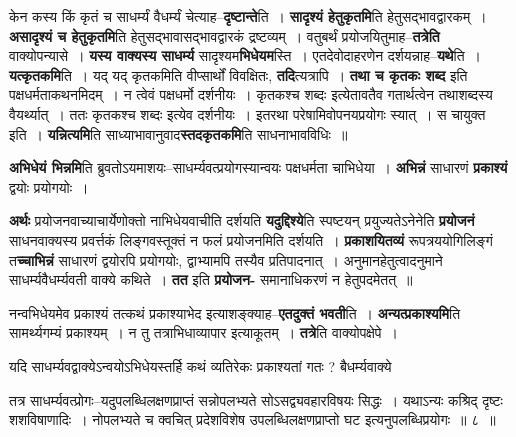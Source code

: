 \documentclass[article,12pt,a4paper]{memoir}
\begin{document}
	  \endgroup
	

	  \pstart केन कस्य किं कृतं च साधर्म्यं वैधर्म्यं चेत्याह--\textbf{दृष्टान्ते}ति । \textbf{सादृश्यं हेतुकृतमि}ति हेतुसद्भावद्वारकम् । \textbf{असादृश्यं च हेतुकृतमि}ति हेतुसद्भावासद्भावद्वारकं द्रष्टव्यम् । वतुबर्थं प्रयोजयितुमाह--\textbf{तत्रेति} वाक्योपन्यासे । \textbf{यस्य वाक्यस्य साधर्म्य} सादृश्यम\textbf{भिधेयम}स्ति । एतदेवोदाहरणेन दर्शयन्नाह--\textbf{यथे}ति । \textbf{यत्कृतकमि}ति । यद् यद् कृतकमिति वीप्सार्थों विवक्षितः, \textbf{तदि}त्यत्रापि । \textbf{तथा च कृतकः शब्द} इति पक्षधर्मताकथनमिदम् । न त्वेवं पक्षधर्मो दर्शनीयः । कृतकश्च शब्दः इत्येतावतैव गतार्थत्वेन तथाशब्दस्य वैयर्थ्यात् । ततः कृतकश्च शब्दः इत्येव दर्शनीयः । इतरथा परेषामिवोपनयप्रयोगः स्यात् । स चायुक्त इति । \textbf{यन्नित्यमि}ति साध्याभावानुवाद\textbf{स्तदकृतकमि}ति साधनाभावविधिः ॥
	\pend
      

	  \pstart \textbf{अभिधेयं भिन्नमि}ति ब्रुवतोऽयमाशयः--साधर्म्यवत्प्रयोगस्यान्वयः पक्षधर्मता चाभिधेया । \textbf{अभिन्नं} साधारणं \textbf{प्रकाश्यं} द्वयोः प्रयोगयोः ।
	\pend
      

	  \pstart \textbf{अर्थः} प्रयोजनवाच्याचार्येणोक्तो नाभिधेयवाचीति दर्शयति \textbf{यदुद्दिश्ये}ति स्पष्टयन् प्रयुज्यतेऽनेनेति \textbf{प्रयोजनं} साधनवाक्यस्य प्रवर्त्तकं लिङ्गवस्तूक्तं न फलं प्रयोजनमिति दर्शयति । \textbf{प्रकाशयितव्यं} रूपत्रययोगिलिङ्गं त\textbf{च्चाभिन्नं} साधारणं द्वयोरपि प्रयोगयोः, द्वाभ्यामपि तस्यैव प्रतिपादनात् । अनुमानहेतुत्वादनुमाने साधर्म्यवैधर्म्यवती वाक्ये कथिते । \textbf{तत} इति \textbf{प्रयोजन-} समानाधिकरणं न हेतुपदमेतत् ॥
	\pend
      

	  \pstart नन्वभिधेयमेव प्रकाश्यं तत्कथं प्रकाश्याभेद इत्याशङ्क्याह--\textbf{एतदुक्तं भवती}ति । \textbf{अन्यत्प्रकाश्यमि}ति सामर्थ्यगम्यं प्रकाश्यम् । न तु तत्राभिधाव्यापार इत्याकूतम् । \textbf{तत्रे}ति वाक्योपक्षेपे ।
	\pend
      

	  \pstart यदि साधर्म्यवद्वाक्येऽन्वयोऽभिधेयस्तर्हि कथं व्यतिरेकः प्रकाश्यतां गतः ? बैधर्म्यवाक्ये  \leavevmode{} 
	  
	तत्र साधर्म्यवत्प्रोगः--यदुपलब्धिलक्षणप्राप्तं सन्नोपलभ्यते सोऽसद्व्यवहारविषयः सिद्धः । यथाऽन्यः कश्रिद् दृष्टः शशविषाणादिः । नोपलभ्यते च क्वचित् प्रदेशविशेष उपलब्धिलक्षणप्राप्तो घट इत्यनुपलब्धिप्रयोगः ॥ ८ ॥ 
	  
\end{document}
